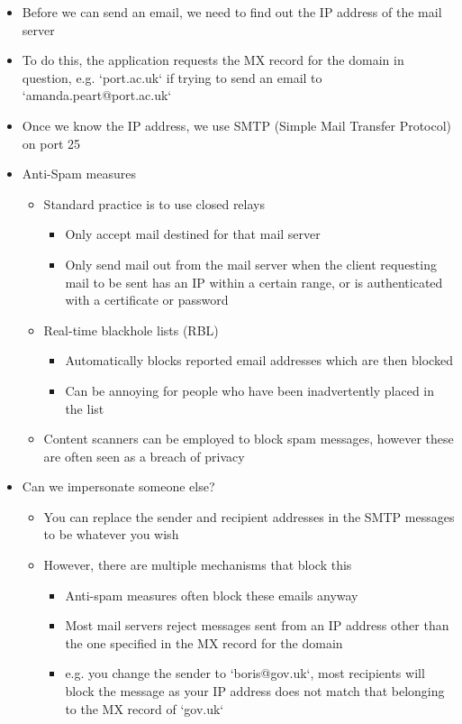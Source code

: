 \begin{itemize}
  \item Before we can send an email, we need to find out the IP address of the mail server
  \item To do this, the application requests the MX record for the domain in question, e.g. `port.ac.uk` if trying to send an email to `amanda.peart@port.ac.uk`
  \item Once we know the IP address, we use SMTP (Simple Mail Transfer Protocol) on port 25
  \item Anti-Spam measures
  \begin{itemize}
    \item Standard practice is to use closed relays
    \begin{itemize}
      \item Only accept mail destined for that mail server
      \item Only send mail out from the mail server when the client requesting mail to be sent has an IP within a certain range, or is authenticated with a certificate or password
    \end{itemize}
    \item Real-time blackhole lists (RBL)
    \begin{itemize}
      \item Automatically blocks reported email addresses which are then blocked
      \item Can be annoying for people who have been inadvertently placed in the list
    \end{itemize}
    \item Content scanners can be employed to block spam messages, however these are often seen as a breach of privacy
  \end{itemize}
  \item Can we impersonate someone else?
  \begin{itemize}
    \item You can replace the sender and recipient addresses in the SMTP messages to be whatever you wish
    \item However, there are multiple mechanisms that block this
    \begin{itemize}
      \item Anti-spam measures often block these emails anyway
      \item Most mail servers reject messages sent from an IP address other than the one specified in the MX record for the domain
      \item e.g. you change the sender to `boris@gov.uk`, most recipients will block the message as your IP address does not match that belonging to the MX record of `gov.uk`
    \end{itemize}
  \end{itemize}
\end{itemize}

